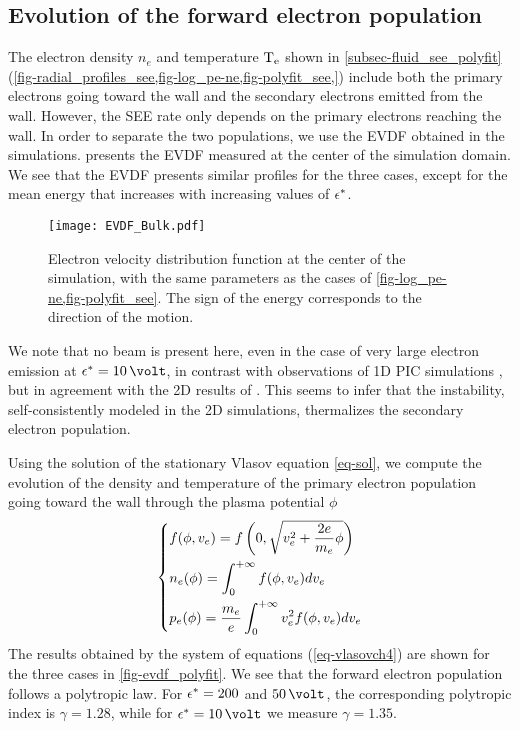\subsection{Evolution of the forward electron population} \label{subsec-EVDF_see_polyfit}

The electron density $n_e$ and  temperature $\mathrm{T_e}$ shown in \cref{subsec-fluid_see_polyfit} (\cref{fig-radial_profiles_see,fig-log_pe-ne,fig-polyfit_see,}) include both the primary electrons going toward the wall and the secondary electrons emitted from the wall.
However, the \ac{SEE} rate only depends on the primary electrons reaching the wall.
In order to separate the two populations, we use the \ac{EVDF} obtained in the simulations.
 presents the \ac{EVDF} measured at the center of the simulation domain. 
We see that the \ac{EVDF} presents similar profiles for the three cases, except for the mean energy that increases with increasing values of $\epsilon^{*}$.
\begin{figure}[!hbt]
  \centering
  \texttt{[image: EVDF\_Bulk.pdf]}
  \caption{Electron velocity distribution function at the center of the simulation, with the same parameters as the cases of \cref{fig-log_pe-ne,fig-polyfit_see}. The sign of the energy corresponds to the direction of the motion.}
  \label{fig-evdf_epsstar}
\end{figure}

We note that no beam is present here, even in the case of very large electron emission at $\crover=10\,\volt$, in contrast with observations of \ac{1D} PIC simulations \citep{sydorenko2006b,sydorenko2007}, but in agreement with the \ac{2D} results of \citet{heron2013}.
This seems to infer that the instability, self-consistently modeled in the \ac{2D} simulations, thermalizes the secondary electron population.

Using the solution of the stationary Vlasov equation \cref{eq-sol}, we compute the evolution of the density and temperature of the primary electron population going toward the wall through the plasma potential $\phi$ 
\begin{equation} \label{eq-vlasovch4}
  \begin{dcases}
    f(\phi, v_e) = f \left( 0, \sqrt{v_e^2 + \frac{2 e}{m_e} \phi} \right) \\
    n_e(\phi) = \int_0^{+\infty} f(\phi, v_e) dv_e \\
    p_e(\phi) = \frac{m_e}{e} \int_0^{+\infty} v_e^2 f(\phi, v_e) dv_e \\
  \end{dcases}
\end{equation}
The results obtained by the system of equations (\ref{eq-vlasovch4}) are shown for the three cases in \cref{fig-evdf_polyfit}.
We see that the forward electron population follows a polytropic law.
For $\epsilon^{*}= 200$ and $50\,\volt$, the corresponding polytropic index is $\gamma=1.28$, while for $\crover= 10\,\volt$ we measure $\gamma=1.35$.

